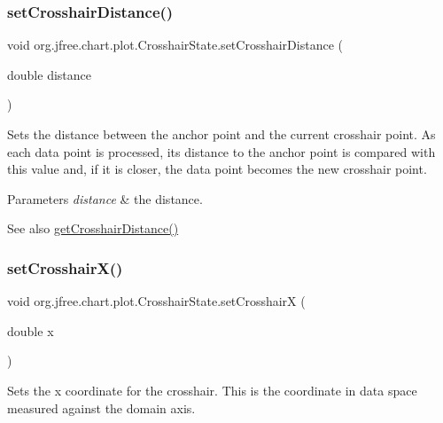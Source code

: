 \subsubsection{\texorpdfstring{set\+Crosshair\+Distance()}{setCrosshairDistance()}}
{\footnotesize\ttfamily void org.\+jfree.\+chart.\+plot.\+Crosshair\+State.\+set\+Crosshair\+Distance (\begin{DoxyParamCaption}\item[{double}]{distance }\end{DoxyParamCaption})}

Sets the distance between the anchor point and the current crosshair point. As each data point is processed, its distance to the anchor point is compared with this value and, if it is closer, the data point becomes the new crosshair point.


\begin{DoxyParams}{Parameters}
{\em distance} & the distance.\\
\hline
\end{DoxyParams}
\begin{DoxySeeAlso}{See also}
\mbox{\hyperlink{classorg_1_1jfree_1_1chart_1_1plot_1_1_crosshair_state_a5d99b61ddb5a034c610e2ed763f1d266}{get\+Crosshair\+Distance()}} 
\end{DoxySeeAlso}
\mbox{\label{classorg_1_1jfree_1_1chart_1_1plot_1_1_crosshair_state_a14e7d9a337753cc7a70144d5f29d65a4}} 
\subsubsection{\texorpdfstring{set\+Crosshair\+X()}{setCrosshairX()}}
{\footnotesize\ttfamily void org.\+jfree.\+chart.\+plot.\+Crosshair\+State.\+set\+CrosshairX (\begin{DoxyParamCaption}\item[{double}]{x }\end{DoxyParamCaption})}

Sets the x coordinate for the crosshair. This is the coordinate in data space measured against the domain axis.


